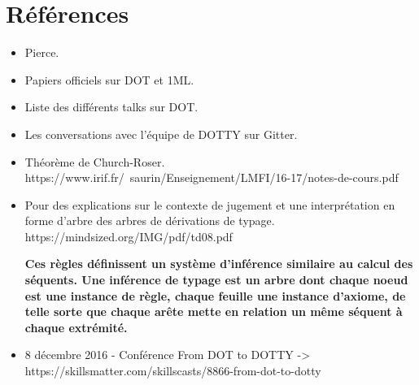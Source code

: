 \section{Références}

\begin{itemize}
  \item Pierce.
  \item Papiers officiels sur DOT et 1ML.
  \item Liste des différents talks sur DOT.
  \item Les conversations avec l'équipe de DOTTY sur Gitter.
  \item Théorème de Church-Roser. https://www.irif.fr/~saurin/Enseignement/LMFI/16-17/notes-de-cours.pdf
\end{itemize}

\begin{itemize}
  \item Pour des explications sur le contexte de jugement et une interprétation en
  forme d'arbre des arbres de dérivations de typage.
  https://mindsized.org/IMG/pdf/td08.pdf

  \textbf{Ces règles définissent un système d’inférence
similaire au calcul des séquents. Une inférence
de typage est un arbre dont chaque noeud est
une instance de règle, chaque feuille une instance
d’axiome, de telle sorte que chaque arête mette en
relation un même séquent à chaque extrémité.}

  \item 8 décembre 2016 - Conférence From DOT to DOTTY -> https://skillsmatter.com/skillscasts/8866-from-dot-to-dotty
\end{itemize}